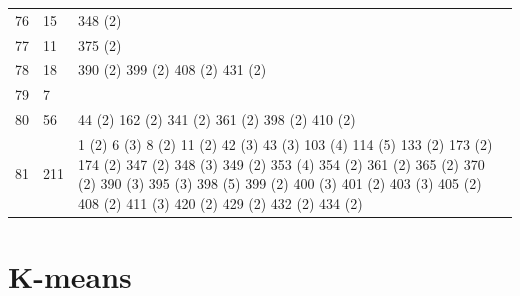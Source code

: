 \begin{landscape}
\begin{longtable}{|p{1.5cm}|p{1.25cm}|p{21cm}|}
76 & 15 & 348 (2) \\
77 & 11 & 375 (2) \\
78 & 18 & 390 (2) 399 (2) 408 (2) 431 (2) \\
79 & 7 & \\
80 & 56 & 44 (2) 162 (2) 341 (2) 361 (2) 398 (2) 410 (2) \\
81 & 211 & 1 (2) 6 (3) 8 (2) 11 (2) 42 (3) 43 (3) 103 (4) 114 (5) 133 (2) 173 (2) 174 (2) 347 (2) 348 (3) 349 (2) 353 (4) 354 (2) 361 (2) 365 (2) 370 (2) 390 (3) 395 (3) 398 (5) 399 (2) 400 (3) 401 (2) 403 (3) 405 (2) 408 (2) 411 (3) 420 (2) 429 (2) 432 (2) 434 (2) \\
\hline
\end{longtable}
\end{landscape}

\section{K-means}

